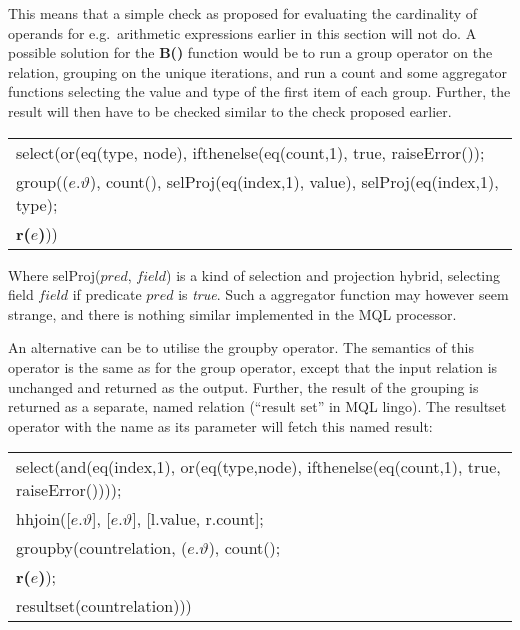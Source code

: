 This means that a simple check as proposed for evaluating the cardinality of operands for e.g.\ arithmetic
expressions earlier in this section will not do. A possible solution for the \textbf{B()} function would be to run
a \textsf{group} operator on the relation, grouping on the unique iterations, and run a \textsf{count} and some
aggregator functions selecting the value and type of the first item of each group. Further, the result will then
have to be checked similar to the check proposed earlier.
\begin{center}
\begin{tabular}{l}
\textsf{select(or(eq(type, node), ifthenelse(eq(count,1), true, raiseError());} \\\quad
\textsf{group((}$e.\vartheta$\textsf{), count(), selProj(eq(index,1), value), selProj(eq(index,1), type);}
\\\quad\quad
\textbf{r(}$e$\textbf{)}\textsf{))}
\end{tabular}
\end{center}
Where \textsf{selProj(}$pred$, $field$\textsf{)} is a kind of selection and projection hybrid, selecting field
$field$ if predicate $pred$ is \textit{true}. Such a aggregator function may however seem strange, and there is
nothing similar implemented in the MQL processor.

An alternative can be to utilise the \textsf{groupby} operator. The semantics of this operator is the same as for
the \textsf{group} operator, except that the input relation is unchanged and returned as the output. Further, the
result of the grouping is returned as a separate, named relation (``result set'' in MQL lingo). The
\textsf{resultset} operator with the name as its parameter will fetch this named result:

\begin{center}
\begin{tabular}{l}
\textsf{select(and(eq(index,1), or(eq(type,node), ifthenelse(eq(count,1), true, raiseError())));} \\ \quad 
\textsf{hhjoin([}$e.\vartheta$\textsf{], [}$e.\vartheta$\textsf{], [l.value, r.count];} \\ \quad\quad
\textsf{groupby(countrelation, (}$e.\vartheta$\textsf{), count();} \\ \quad\quad\quad
\textbf{r(}$e$\textbf{)}\textsf{);} \\ \quad\quad
\textsf{resultset(countrelation)))}
\end{tabular}
\end{center}

